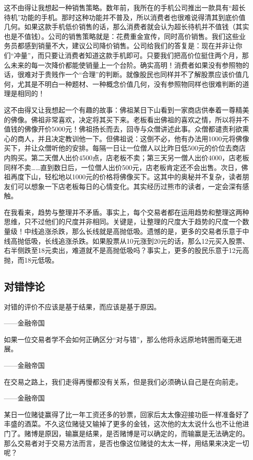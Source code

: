 这不由得让我想起一种销售策略。数年前，我所在的手机公司推出一款具有“超长待机”功能的手机。那时这种功能并不普及，所以消费者也很难说得清其到底价值几何。如果这款手机低价销售的话，那么消费者就会认为超长待机并不值钱（其实也是不值钱）。公司的销售策略就是：花费重金宣传，同时高价销售。我们这些业务员都感到销量不大，建议公司降价销售。公司给我们的答复是：现在并非让你们“冲量”，而只要让消费者知道这款手机即可。只要我们把高价位挺住两个月，那么未来的每一次降价都能使销量上一个台阶。确实高明！消费者如果没有参照物的话，很难对于贵贱作一个“合理”的判断。就像股民也同样并不了解股票应该价值几何，尤其是不明白一种题材、一种概念价值几何，没有参照物同样也很难判断的道理是相同的！

这不由得又让我想起一个有趣的故事：佛祖某日下山看到一家商店供奉着一尊精美的佛像。佛祖非常喜欢，决定将其买下来。老板看出佛祖的喜欢之情，所以将并不值钱的佛像开价5000元！佛祖扬长而去，回寺与众僧讲述此事。众僧都谴责利欲熏心的商人，并且决定教训他一下。但佛祖说：这倒不必，他有办法用1000元将佛像买下，并让众僧听他的安排。每隔一日让一位僧人以比昨日低500元的价位去商店内购买。第二天僧人出价4500点，店老板不卖；第三天另一僧人出价4000，店老板同样不卖……直到数日后，一位僧人出价500元，店老板肯定还不会出售。次日，佛祖再度下山，轻松地以1000元的价格将佛像买下。这其中的奥秘并不复杂，读者朋友们可以想象一下店老板每日的心情变化。其实经历过熊市的读者，一定会深有感触。

在我看来，趋势与整理并不矛盾。事实上，每个交易者都在运用趋势和整理这两种思维，只不过他们的尺度并非相同。关键是，让整理的尺度大于趋势的尺度一个数量级！中线追涨杀跌，那么长线就是高抛低吸。遗憾的是，更多的交易者乐意于中线高抛低吸，长线追涨杀跌。如果股票从10元涨到20元的话，那么12元买入股票、右半侧跌至18元卖出，难道就不是高抛低吸吗？事实上，更多的股民乐意于12元高抛，而18元低吸。

\subsection{对错悖论}

{\kaishu
对错的评价不应该是基于结果，而应该是基于原因。

\hfill ——金融帝国

如果一位交易者学不会如何正确区分“对与错”，那么他将永远原地转圈而毫无进展。

\hfill ——金融帝国

在交易之路上，我们走得再慢都没有关系，但是我们必须确认自己是在向前走。

\hfill ——金融帝国
}

某日一位赌徒赢得了比一年工资还多的钞票，回家后太太像迎接功臣一样准备好了丰盛的酒菜。不久这位赌徒又输掉了更多的金钱，这次他的太太说什么也不让他进门了。赌博是原因，输赢是结果，是否赌博是可以确定的，而输赢是无法确定的。那么交易者对于交易方法而言，是否也像这位赌徒的太太一样，用结果来决定一切呢？

